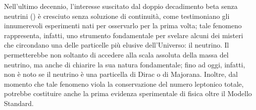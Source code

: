 




Nell'ultimo decennio, l'interesse suscitato dal doppio decadimento beta senza neutrini (\doppiobeta) è cresciuto senza soluzione di continuità, come testimoniano gli innumerevoli esperimenti nati per osservarlo per la prima volta; tale fenomeno rappresenta, infatti, uno strumento fondamentale per svelare alcuni dei misteri che circondano una delle particelle più elusive dell'Universo: il neutrino. 
Il \doppiobeta{} permetterebbe non soltanto di accedere alla scala assoluta della massa del neutrino, ma anche di chiarire la sua natura fondamentale; fino ad oggi, infatti, non è noto se il neutrino è una particella di Dirac o di Majorana. 
Inoltre, dal momento che tale fenomeno viola la conservazione del numero leptonico totale, potrebbe costituire anche la prima evidenza sperimentale di fisica oltre il Modello Standard.

